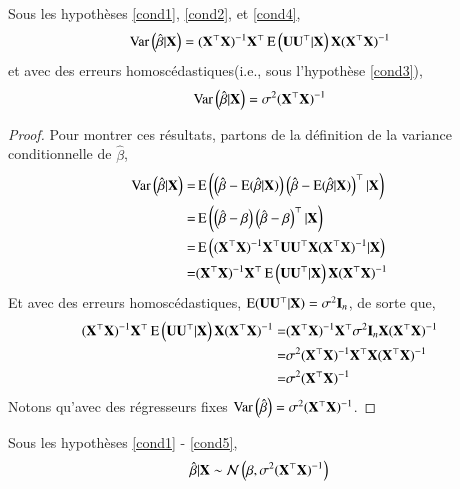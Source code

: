 \documentclass[10pt, reqno]{amsart}
\begin{document}
\begin{propriete}
Sous les hypothèses \eqref{cond1}, \eqref{cond2}, et \eqref{cond4},
\begin{align*}
\operatorname{Var}\left(\hat{\beta} | \mathbf X \right) = (\mathbf X ^\top\mathbf X )^{-1}\mathbf X ^\top\operatorname{E}\left(\mathbf U\mathbf U^\top | \mathbf X \right)\mathbf X (\mathbf X ^\top\mathbf X )^{-1}
\end{align*}
et avec des erreurs homoscédastiques(i.e., sous l'hypothèse \eqref{cond3}),
\begin{align*}
\operatorname{Var}\left(\hat{\beta} | \mathbf X \right) = \sigma^2(\mathbf X ^\top\mathbf X )^{-1}
\end{align*}
\end{propriete}
\begin{proof}
Pour montrer ces résultats, partons de la définition de la variance conditionnelle de $\hat{\beta}$,
\begin{align*}
\operatorname{Var}\left(\hat{\beta} | \mathbf X \right) =& \operatorname{E}\left(\left(\hat{\beta} - \operatorname{E}(\hat{\beta} | \mathbf X )\right) \left(\hat{\beta} - \operatorname{E}(\hat{\beta} | \mathbf X )\right)^\top | \mathbf X \right)\\
=&\operatorname{E}\left(\left(\hat{\beta} - \beta\right) \left(\hat{\beta} - \beta\right) ^\top | \mathbf X \right)\\
=&\operatorname{E}\left((\mathbf X ^\top\mathbf X )^{-1}\mathbf X ^\top\mathbf U\mathbf U^\top\mathbf X (\mathbf X ^\top\mathbf X )^{-1}|\mathbf X \right)\\
=&(\mathbf X ^\top\mathbf X )^{-1}\mathbf X ^\top\operatorname{E}\left(\mathbf U\mathbf U^\top | \mathbf X \right)\mathbf X (\mathbf X ^\top\mathbf X )^{-1}
\end{align*}
Et avec des erreurs homoscédastiques, $\operatorname{E}(\mathbf U\mathbf U^\top| \mathbf X ) = \sigma^2\mathbf{I}_n$, de sorte que,
\begin{align*}
(\mathbf X ^\top\mathbf X )^{-1}\mathbf X ^\top\operatorname{E}\left(\mathbf U\mathbf U^\top | \mathbf X \right)\mathbf X (\mathbf X ^\top\mathbf X )^{-1} =& (\mathbf X ^\top\mathbf X )^{-1}\mathbf X ^\top \sigma^2\mathbf{I}_n \mathbf X (\mathbf X ^\top\mathbf X )^{-1}\\
=& \sigma^2(\mathbf X ^\top\mathbf X )^{-1}\mathbf X ^\top\mathbf X (\mathbf X ^\top\mathbf X )^{-1}\\
=&\sigma^2(\mathbf X ^\top\mathbf X )^{-1}
\end{align*}
Notons qu'avec des régresseurs fixes $\operatorname{Var}\left(\hat{\beta}\right) =  \sigma^2(\mathbf X ^\top\mathbf X )^{-1}$.
\end{proof}
\begin{propriete}
Sous les hypothèses \eqref{cond1} - \eqref{cond5},
\begin{align*}
\hat{\beta} | \mathbf X  \sim \mathcal{N}\left(\beta, \sigma^2(\mathbf X ^\top\mathbf X )^{-1}\right)
\end{align*}
\end{propriete}
\end{document}
